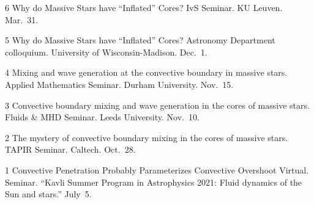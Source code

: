 
      {6}
      { 
        Why do Massive Stars have ``Inflated'' Cores?
      }
      {
        IvS Seminar. KU Leuven. Mar.~31.
      }

      {5}
      { 
        Why do Massive Stars have ``Inflated'' Cores?
      }
      {
        Astronomy Department colloquium. University of Wisconsin-Madison. Dec.~1.
      }

\cvpub{}
      {4}
      {
        Mixing and wave generation at the convective boundary in massive stars.  
      }
      {
        Applied Mathematics Seminar. Durham University. Nov.~15.
      }

\cvpub{}
      {3}
      {
         Convective boundary mixing and wave generation in the cores of massive stars. 
      }
      {
        Fluids \& MHD Seminar. Leeds University. Nov.~10.
      }

\cvpub{}
      {2}
      {
        The mystery of convective boundary mixing in the cores of massive stars.
      }
      {
        TAPIR Seminar. Caltech. Oct.~28.
      }

	  {1}
	  {Convective Penetration Probably Parameterizes Convective Overshoot}
	  {
	  	Virtual. Seminar. ``Kavli Summer Program in Astrophysics 2021: Fluid dynamics of the Sun and stars.'' July~5.
	  }

